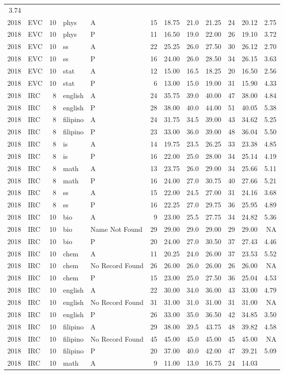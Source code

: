 \documentclass[]{article}
\begin{document}
\begin{longtable}[]{@{}rlrllrrrrrrr@{}}
3.74\tabularnewline
2018 & EVC & 10 & phys & A & 15 & 18.75 & 21.0 & 21.25 & 24 & 20.12 &
2.75\tabularnewline
2018 & EVC & 10 & phys & P & 11 & 16.50 & 19.0 & 22.00 & 26 & 19.10 &
3.72\tabularnewline
2018 & EVC & 10 & ss & A & 22 & 25.25 & 26.0 & 27.50 & 30 & 26.12 &
2.70\tabularnewline
2018 & EVC & 10 & ss & P & 16 & 24.00 & 26.0 & 28.50 & 34 & 26.15 &
3.63\tabularnewline
2018 & EVC & 10 & stat & A & 12 & 15.00 & 16.5 & 18.25 & 20 & 16.50 &
2.56\tabularnewline
2018 & EVC & 10 & stat & P & 6 & 13.00 & 15.0 & 19.00 & 31 & 15.90 &
4.33\tabularnewline
2018 & IRC & 8 & english & A & 24 & 35.75 & 39.0 & 40.00 & 47 & 38.00 &
4.84\tabularnewline
2018 & IRC & 8 & english & P & 28 & 38.00 & 40.0 & 44.00 & 51 & 40.05 &
5.38\tabularnewline
2018 & IRC & 8 & filipino & A & 24 & 31.75 & 34.5 & 39.00 & 43 & 34.62 &
5.25\tabularnewline
2018 & IRC & 8 & filipino & P & 23 & 33.00 & 36.0 & 39.00 & 48 & 36.04 &
5.50\tabularnewline
2018 & IRC & 8 & is & A & 14 & 19.75 & 23.5 & 26.25 & 33 & 23.38 &
4.85\tabularnewline
2018 & IRC & 8 & is & P & 16 & 22.00 & 25.0 & 28.00 & 34 & 25.14 &
4.19\tabularnewline
2018 & IRC & 8 & math & A & 13 & 23.75 & 26.0 & 29.00 & 34 & 25.66 &
5.11\tabularnewline
2018 & IRC & 8 & math & P & 16 & 24.00 & 27.0 & 30.75 & 40 & 27.66 &
5.21\tabularnewline
2018 & IRC & 8 & ss & A & 15 & 22.00 & 24.5 & 27.00 & 31 & 24.16 &
3.68\tabularnewline
2018 & IRC & 8 & ss & P & 16 & 22.25 & 27.0 & 29.75 & 36 & 25.95 &
4.89\tabularnewline
2018 & IRC & 10 & bio & A & 9 & 23.00 & 25.5 & 27.75 & 34 & 24.82 &
5.36\tabularnewline
2018 & IRC & 10 & bio & Name Not Found & 29 & 29.00 & 29.0 & 29.00 & 29
& 29.00 & NA\tabularnewline
2018 & IRC & 10 & bio & P & 20 & 24.00 & 27.0 & 30.50 & 37 & 27.43 &
4.46\tabularnewline
2018 & IRC & 10 & chem & A & 11 & 20.25 & 24.0 & 26.00 & 37 & 23.53 &
5.52\tabularnewline
2018 & IRC & 10 & chem & No Record Found & 26 & 26.00 & 26.0 & 26.00 &
26 & 26.00 & NA\tabularnewline
2018 & IRC & 10 & chem & P & 15 & 23.00 & 25.0 & 27.50 & 36 & 25.04 &
4.53\tabularnewline
2018 & IRC & 10 & english & A & 22 & 30.00 & 34.0 & 36.00 & 43 & 33.00 &
4.79\tabularnewline
2018 & IRC & 10 & english & No Record Found & 31 & 31.00 & 31.0 & 31.00
& 31 & 31.00 & NA\tabularnewline
2018 & IRC & 10 & english & P & 26 & 33.00 & 35.0 & 36.50 & 42 & 34.85 &
3.50\tabularnewline
2018 & IRC & 10 & filipino & A & 29 & 38.00 & 39.5 & 43.75 & 48 & 39.82
& 4.58\tabularnewline
2018 & IRC & 10 & filipino & No Record Found & 45 & 45.00 & 45.0 & 45.00
& 45 & 45.00 & NA\tabularnewline
2018 & IRC & 10 & filipino & P & 20 & 37.00 & 40.0 & 42.00 & 47 & 39.21
& 5.09\tabularnewline
2018 & IRC & 10 & math & A & 9 & 11.00 & 13.0 & 16.75 & 24 & 14.03 &

\end{longtable}
\end{document}
